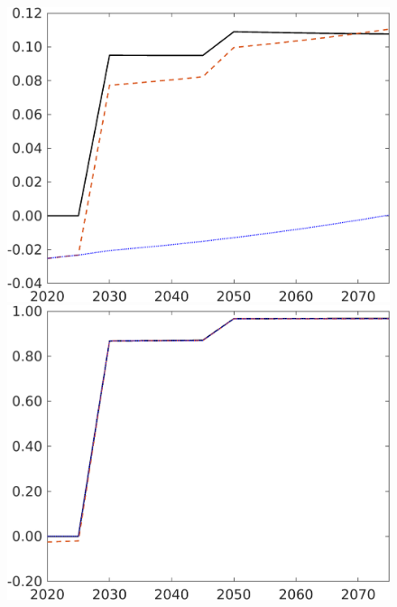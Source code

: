 \begin{figure}[h!!]
\begin{minipage}[]{0.32\textwidth}
	\end{minipage}
	\begin{minipage}[]{0.32\textwidth}
		\includegraphics[width=1\textwidth]{../../codding_model/own_basedOnFried/optimalPol_190722_tidiedUp/figures/all_July22/taul_CompEffOPT_T_NoTaus_pol4_spillover0_noskill1_sep1_xgrowth0_etaa0.79_lgd0_lff0.png}
	\end{minipage}
	\begin{minipage}[]{0.32\textwidth}
		\includegraphics[width=1\textwidth]{../../codding_model/own_basedOnFried/optimalPol_190722_tidiedUp/figures/all_July22/tauf_CompEffOPT_T_NoTaus_pol4_spillover0_noskill1_sep1_xgrowth0_etaa0.79_lgd0_lff0.png}
	\end{minipage}
\end{figure}

